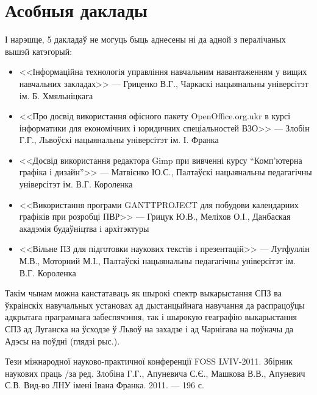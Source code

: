 \documentclass[10pt, a5paper]{article}
\begin{document}
\section{Асобныя даклады}
І нарэшце, 5 дакладаў не могуць быць аднесены ні да адной з пералічаных вышэй катэгорый:
\begin{itemize}
\item  <<Інформаційна технологія управління навчальним навантаженням у вищих навчальних закладах>> --- Гриценко В.Г., Чаркаскі нацыянальны універсітэт  ім. Б. Хмяльніцкага
\item  <<Про досвід використання офісного  пакету OpenOffice.org.ukr в курсі інформатики для економічних і юридичних спеціальностей ВЗО>> --- Злобін Г.Г., Львоўскі нацыянальны універсітэт ім. І. Франка 
\item  <<Досвід використання  редактора Gimp при вивченні курсу “Комп'ютерна графіка і дизайн”>> --- Матвієнко Ю.С., Палтаўскі нацыянальны педагагічны універсітэт ім.  В.Г. Короленка
\item <<Використання програми GANTTPROJECT для побудови календарних графіків при розробці ПВР>> --- Грицук Ю.В., Меліхов О.І., Данбаская акадэмія будаўніцтва і архітэктуры
\item <<Вільне ПЗ для підготовки наукових текстів і презентацій>> --- Лутфуллін М.В., Моторний М.І., Палтаўскі нацыянальны педагагічны універсітэт ім.  В.Г. Короленка
\end{itemize}

	Такім чынам можна канстатаваць як шырокі спектр выкарыстання СПЗ ва ўкраінскіх навучальных установах ад дыстанцыйнага навучання да распрацоўцы адкрытага праграмнага забеспячэння, так і шырокую геаграфію выкарыстання СПЗ ад Луганска на ўсходзе ў Львоў на захадзе і ад Чарнігава на поўначы да Адэсы на поўдні (глядзі рыс.).

\begin{figure}[ht]
\label{pic:fl1}
\end{figure}

\begin{thebibliography}{9}
Тези міжнародної науково-практичної конференції FOSS LVIV-2011. Збірник наукових праць /за ред. Злобіна Г.Г., Апуневича С.Є., Машкова В.В., Апуневич С.В. Вид-во ЛНУ імені Івана Франка. 2011. --- 196 с.
\end{thebibliography}
\end{document}
